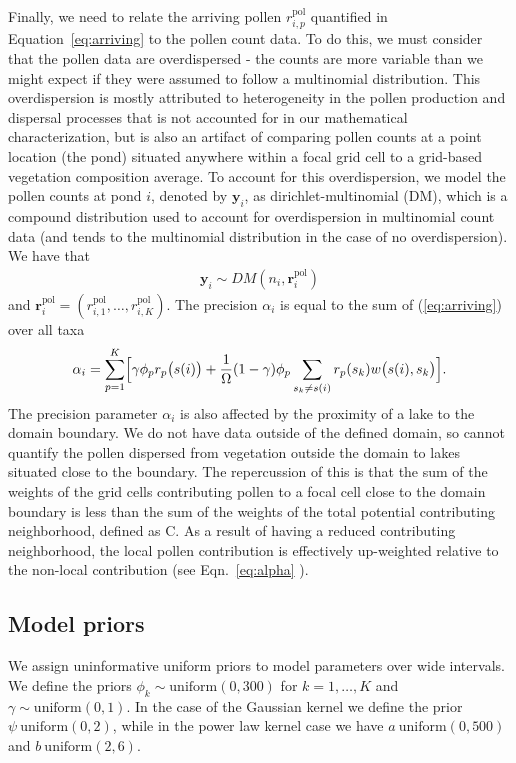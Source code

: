 \documentclass[12pt]{article}
\begin{document}
Finally, we need to relate the arriving pollen $r_{i,p}^{\text{pol}}$
quantified in Equation~\ref{eq:arriving} to the pollen count data. To
do this, we must consider that the pollen data are overdispersed - the
counts are more variable than we might expect if they were assumed to
follow a multinomial distribution. This overdispersion is mostly
attributed to heterogeneity in the pollen production and dispersal
processes that is not accounted for in our mathematical
characterization, but is also an artifact of comparing pollen counts
at a point location (the pond) situated anywhere within a focal grid
cell to a grid-based vegetation composition average. To account for
this overdispersion, we model the pollen counts at pond $i$, denoted
by $\bm{y}_i$, as dirichlet-multinomial (DM), which is a compound
distribution used to account for overdispersion in multinomial count
data (and tends to the multinomial distribution in the case of no
overdispersion). We have that
\begin{align}
\bm{y}_i \sim DM (n_i, \bm{r}_i^{\text{pol}})
\label{eq:DM}
\end{align}
and $\bm{r}_i^{\text{pol}} = (r_{i,1}^{\text{pol}}, \ldots,
r_{i,K}^{\text{pol}})$.  The precision $\alpha_i$ is equal to the sum
of (\ref{eq:arriving}) over all taxa
\begin{align}
\alpha_i = \sum_{p=1}^K \Bigl[\gamma \phi_p r_p\bigl(s(i)\bigr) + \frac{1}{\Omega} (1-\gamma) \phi_p \sum_{s_k \neq s(i) } r_p(s_k) w\bigl(s(i), s_k\bigr)\Bigr].
\label{eq:alpha}
\end{align}
The precision parameter $\alpha_i$ is also affected by the proximity
of a lake to the domain boundary. We do not have data outside of the
defined domain, so cannot quantify the pollen dispersed from
vegetation outside the domain to lakes situated close to the
boundary. The repercussion of this is that the sum of the weights of
the grid cells contributing pollen to a focal cell close to the domain
boundary is less than the sum of the weights of the total potential
contributing neighborhood, defined as C. As a result of having a
reduced contributing neighborhood, the local pollen contribution is
effectively up-weighted relative to the non-local contribution (see
Eqn.~\ref{eq:alpha} ).

\subsection{Model priors}

We assign uninformative uniform priors to model parameters over wide
intervals. We define the priors $\phi_k \sim \text{uniform}(0, 300)$ for
$k=1, \ldots, K$ and $\gamma \sim \text{uniform}(0,1)$. In the case of the
Gaussian kernel we define the prior $\psi ~ \text{uniform}(0, 2)$, while in
the power law kernel case we have $a ~ \text{uniform}(0, 500)$ and
$b~\text{uniform}(2, 6)$.
\end{document}
